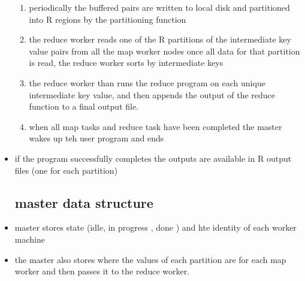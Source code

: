\documentclass{article}
\begin{document}
\begin{itemize}
\begin{enumerate}
        \item periodically the buffered pairs are written to local disk and partitioned into R regions by the partitioning function 
        \item the reduce worker reads one of the R partitions of the intermediate key value pairs from all the map worker nodes once all data for that partition is read, the reduce worker  sorts by intermediate keys 
        \item the reduce worker than runs the reduce program on each unique intermediate key value, and then appends the output of the reduce function to a final output file. 
        \item when all map tasks and reduce task have been completed the master wakes up teh user program and ends 
    \end{enumerate}
    \item if the program successfully completes the outputs are available in R output files (one for each partition)
    \subsection*{master data structure}
    \item master stores state (idle, in progress , done ) and hte identity of each worker machine 
    \item the master also stores where the values of each partition are for each map worker and then passes it to the reduce worker. 

\end{itemize}
\end{document}
